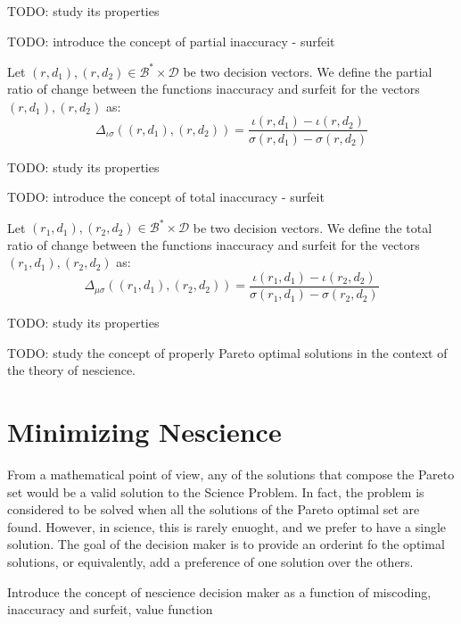 {\color{red} TODO: study its properties}

{\color{red} TODO: introduce the concept of partial inaccuracy - surfeit}

\begin{definition}
Let $(r, d_1), (r, d_2) \in \mathcal{B}^\ast \times \mathcal{D}$ be two decision vectors. We define the partial ratio of change between the functions inaccuracy and surfeit for the vectors $(r, d_1), (r, d_2)$ as:
\[
\Delta_{\iota \sigma} \left( (r, d_1), (r, d_2) \right) = \frac{ \iota(r, d_1) - \iota(r, d_2) }{ \sigma(r, d_1) - \sigma(r, d_2) }
\] 
\end{definition}

{\color{red} TODO: study its properties}

{\color{red} TODO: introduce the concept of total inaccuracy - surfeit}

\begin{definition}
Let $(r_1, d_1), (r_2, d_2) \in \mathcal{B}^\ast \times \mathcal{D}$ be two decision vectors. We define the total ratio of change between the functions inaccuracy and surfeit for the vectors $(r_1, d_1), (r_2, d_2)$ as:
\[
\Delta_{\mu \sigma} \left( (r_1, d_1), (r_2, d_2) \right) = \frac{ \iota(r_1, d_1) - \iota(r_2, d_2) }{ \sigma(r_1, d_1) - \sigma(r_2, d_2) }
\] 
\end{definition}

{\color{red} TODO: study its properties}

{\color{red} TODO: study the concept of properly Pareto optimal solutions in the context of the theory of nescience.}

%
%

\section{Minimizing Nescience}
\label{sec:minimizing_nescience}

From a mathematical point of view, any of the solutions that compose the Pareto set would be a valid solution to the Science Problem. In fact, the problem is considered to be solved when all the solutions of the Pareto optimal set are found. However, in science, this is rarely enuoght, and we prefer to have a single solution. The goal of the decision maker is to provide an orderint fo the optimal solutions, or equivalently, add a preference of one solution over the others.

{\color{red} Introduce the concept of nescience decision maker as a function of miscoding, inaccuracy and surfeit, value function}

